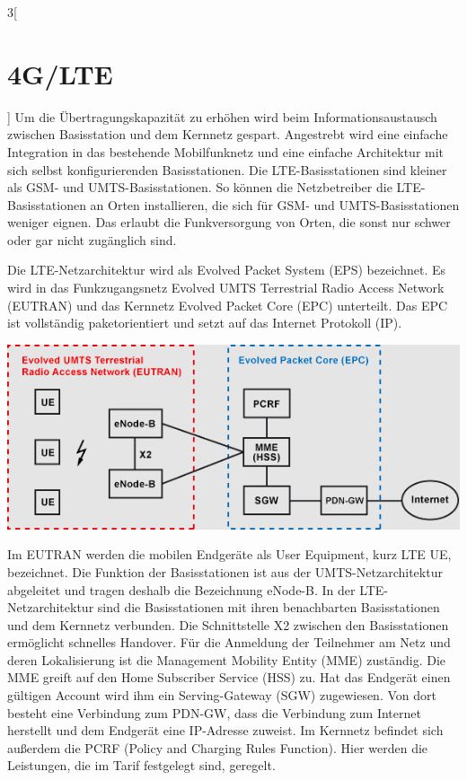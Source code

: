\begin{multicols}{3}[\section{4G/LTE}]
Um die Übertragungskapazität zu erhöhen wird beim Informationsaustausch zwischen Basisstation und dem Kernnetz gespart. Angestrebt wird eine einfache Integration in das bestehende Mobilfunknetz und eine einfache Architektur mit sich selbst konfigurierenden Basisstationen.
Die LTE-Basisstationen sind kleiner als GSM- und UMTS-Basisstationen. So können die Netzbetreiber die LTE-Basisstationen an Orten installieren, die sich für GSM- und UMTS-Basisstationen weniger eignen. Das erlaubt die Funkversorgung von Orten, die sonst nur schwer oder gar nicht zugänglich sind.

Die LTE-Netzarchitektur wird als Evolved Packet System (EPS) bezeichnet. Es wird in das Funkzugangsnetz Evolved UMTS Terrestrial Radio Access Network (EUTRAN) und das Kernnetz Evolved Packet Core (EPC) unterteilt. Das EPC ist vollständig paketorientiert und setzt auf das Internet Protokoll (IP).
\begin{Figure}
\includegraphics[width=\linewidth]{Kapitel/4GLTE/Grafiken/Modell.png}
\label{fig:vorlage.vorlesungssaal}
\end{Figure}

Im EUTRAN werden die mobilen Endgeräte als User Equipment, kurz LTE UE, bezeichnet. Die Funktion der Basisstationen ist aus der UMTS-Netzarchitektur abgeleitet und tragen deshalb die Bezeichnung eNode-B. In der LTE-Netzarchitektur sind die Basisstationen mit ihren benachbarten Basisstationen und dem Kernnetz verbunden. Die Schnittstelle X2 zwischen den Basisstationen ermöglicht schnelles Handover.
Für die Anmeldung der Teilnehmer am Netz und deren Lokalisierung ist die Management Mobility Entity (MME) zuständig. Die MME greift auf den Home Subscriber Service (HSS) zu. Hat das Endgerät einen gültigen Account wird ihm ein Serving-Gateway (SGW) zugewiesen. Von dort besteht eine Verbindung zum PDN-GW, dass die Verbindung zum Internet herstellt und dem Endgerät eine IP-Adresse zuweist.
Im Kernnetz befindet sich außerdem die PCRF (Policy and Charging Rules Function). Hier werden die Leistungen, die im Tarif festgelegt sind, geregelt. ~\cite{4GLTE.3}


\end{multicols}
